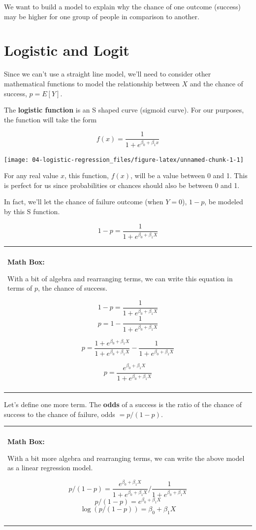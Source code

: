 \documentclass[
]{book}
\newenvironment{mathbox}
{
    \begin{center}
    
    \begin{tabular}{|p{0.8\textwidth}|}
    \rowcolor{LightYellow}
    \hline\\
    \rowcolor{LightYellow}
    \textbf{Math Box:}
}
{
    \\\rowcolor{LightYellow}
    \\\hline
    \end{tabular} 
    \end{center}
}
\begin{document}
We want to build a model to explain why the chance of one outcome (success) may be higher for one group of people in comparison to another.

\section{Logistic and Logit}\label{logistic-and-logit}

Since we can't use a straight line model, we'll need to consider other mathematical functions to model the relationship between \(X\) and the chance of success, \(p=E[Y]\).

The \textbf{logistic function} is an S shaped curve (sigmoid curve). For our purposes, the function will take the form

\[f(x) = \frac{1}{1 + e^{\beta_0 +\beta_1x}}\]

\begin{center}\texttt{[image: 04-logistic-regression\_files/figure-latex/unnamed-chunk-1-1]} \end{center}

For any real value \(x\), this function, \(f(x)\), will be a value between 0 and 1. This is perfect for us since probabilities or chances should also be between 0 and 1.

In fact, we'll let the chance of failure outcome (when \(Y=0\)), \(1-p\), be modeled by this S function.

\[1-p = \frac{1}{1 + e^{\beta_0 +\beta_1X}}\]

\begin{mathbox}
With a bit of algebra and rearranging terms, we can write this equation
in terms of \(p\), the chance of success.

\[1-p = \frac{1}{1 + e^{\beta_0 +\beta_1X}}\]
\[p = 1-\frac{1}{1 + e^{\beta_0 +\beta_1X}}\]

\[p = 
\frac{1 + e^{\beta_0 +\beta_1X}}{1 + e^{\beta_0 +\beta_1X}}-\frac{1}{1 + e^{\beta_0 +\beta_1X}}\]

\[p = \frac{e^{\beta_0 +\beta_1X}}{1 + e^{\beta_0 +\beta_1X}}\]
\end{mathbox}

Let's define one more term. The \textbf{odds} of a success is the ratio of the chance of success to the chance of failure, odds \(=p/(1-p)\).

\begin{mathbox}
With a bit more algebra and rearranging terms, we can write the above
model as a linear regression model.

\[p/(1-p) = \frac{e^{\beta_0 +\beta_1X}}{1 + e^{\beta_0 +\beta_1X}}/\frac{1}{1 + e^{\beta_0 +\beta_1X}}\]
\[p/(1-p) = e^{\beta_0 +\beta_1X}\]
\[\log(p/(1-p)) = \beta_0 +\beta_1X\]
\end{mathbox}
\end{document}
